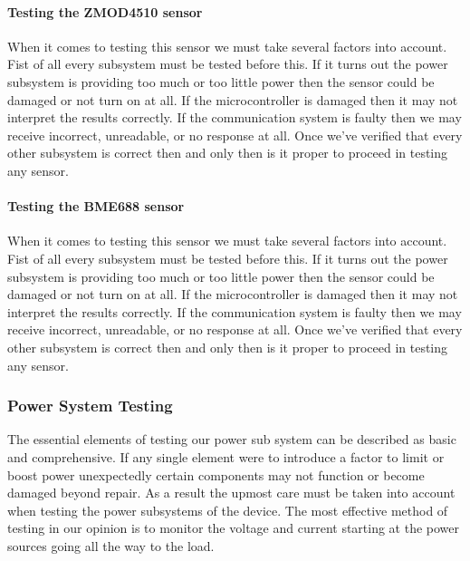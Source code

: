\paragraph{Testing the ZMOD4510 sensor}
When it comes to testing this sensor we must take several factors into account. Fist of all every subsystem must be tested before this. If it turns out the power subsystem is providing too much or too little power then the sensor could be damaged or not turn on at all. If the microcontroller is damaged then it may not interpret the results correctly. If the communication system is faulty then we may receive incorrect, unreadable, or no response at all. Once we've verified that every other subsystem is correct then and only then is it proper to proceed in testing any sensor.

\paragraph{Testing the BME688 sensor}
When it comes to testing this sensor we must take several factors into account. Fist of all every subsystem must be tested before this. If it turns out the power subsystem is providing too much or too little power then the sensor could be damaged or not turn on at all. If the microcontroller is damaged then it may not interpret the results correctly. If the communication system is faulty then we may receive incorrect, unreadable, or no response at all. Once we've verified that every other subsystem is correct then and only then is it proper to proceed in testing any sensor.

\subsubsection{Power System Testing}
The essential elements of testing our power sub system can be described as basic and comprehensive. If any single element were to introduce a factor to limit or boost power unexpectedly certain components may not function or become damaged beyond repair. As a result the upmost care must be taken into account when testing the power subsystems of the device. The most effective method of testing in our opinion is to monitor the voltage and current starting at the power sources going all the way to the load. 

